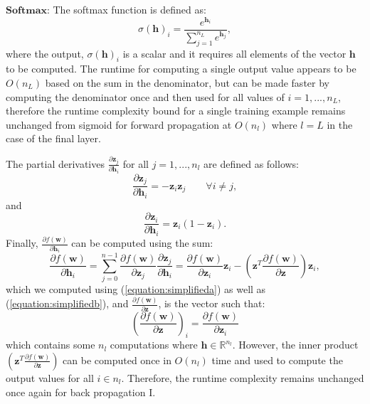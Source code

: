 \documentclass[letterpaper,12pt,titlepage,oneside,final]{book}
\begin{document}
	$\mathbf{Softmax}$:
	The softmax function is defined as:
	\begin{equation}
	\sigma(\mathbf{h})_{i} = \frac{e^{\mathbf{h}_{i}}}{\sum_{j=1}^{n_{L}}{e^{\mathbf{h}_{j}}}},
	\end{equation}
	where the output, $\sigma(\mathbf{h})_{i}$ is a scalar and it requires all elements of the vector $\mathbf{h}$ to be computed. The runtime for computing a single output value appears to be $O(n_{L})$ based on the sum in the denominator, but can be made faster by computing the denominator once and then used for all values of $i=1,...,n_{L}$, therefore the runtime complexity bound for a single training example remains unchanged from sigmoid for forward propagation at $O(n_{l})$ where $l=L$ in the case of the final layer. 
	
	The partial derivatives $\frac{\partial{\mathbf{z}_{j}}}{\partial{\mathbf{h}_{i}}}$ for all $j=1,...,n_{l}$ are defined as follows:
	\begin{equation}
	\frac{\partial{\mathbf{z}_{j}}}{\partial{\mathbf{h}_{i}}} = -\mathbf{z}_{i}\mathbf{z}_{j} \quad \quad \forall i \neq j ,
	\label{equation:simplifieda}
	\end{equation}
	and
	\begin{equation}
	\frac{\partial{\mathbf{z}_{i}}}{\partial{\mathbf{h}_{i}}} = \mathbf{z}_{i}(1 - \mathbf{z}_{i}).
	\label{equation:simplifiedb}
	\end{equation}
	Finally, $\frac{\partial{f(\mathbf{w})}}{\partial{\mathbf{h}_{i}}}$ can be computed using the sum:
	\begin{equation}
	\frac{\partial{f(\mathbf{w})}}{\partial{\mathbf{h}_{i}}} = \sum_{j = 0}^{n-1}{\frac{\partial{f(\mathbf{w})}}{\partial{\mathbf{z}_{j}}}\frac{\partial{\mathbf{z}_{j}}}{\partial{\mathbf{h}_{i}}}} = \frac{\partial{f(\mathbf{w})}}{\partial{\mathbf{z}_{i}}}\mathbf{z}_{i} - (\mathbf{z}^{T}\frac{\partial{f(\mathbf{w})}}{\partial{\mathbf{z}}})\mathbf{z}_{i},
	\end{equation}
	which we computed using (\ref{equation:simplifieda}) as well as (\ref{equation:simplifiedb}), and $\frac{\partial{f(\mathbf{w})}}{\partial{\mathbf{z}}}$, is the vector such that:
	\begin{equation}
	(\frac{\partial{f(\mathbf{w})}}{\partial{\mathbf{z}}})_{i} = \frac{\partial{f(\mathbf{w})}}{\partial{\mathbf{z}_{i}}}
	\end{equation}
	which contains some $n_{l}$ computations where $\mathbf{h} \in \mathbb{R}^{n_{l}}$. However, the inner product $(\mathbf{z}^{T}\frac{\partial f(\mathbf{w})}{\partial{\mathbf{z}}})$ can be computed once in $O(n_{l})$ time and used to compute the output values for all $i \in n_{l}$. Therefore, the runtime complexity remains unchanged once again for back propagation I. 
	
\end{document}
